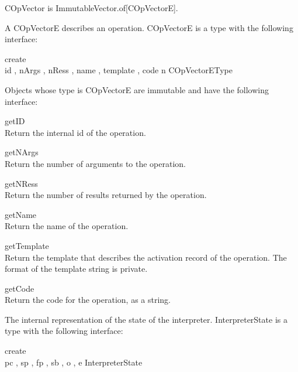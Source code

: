 \label{builtin COpVector}
COpVector is ImmutableVector.of[COpVectorE].

\label{builtin COpVectorE}
A COpVectorE describes an operation.  COpVectorE is a type with
the following interface:

\begin{desc}
  \item[\kw{operation} create\/\LB{}]~\\
    id \CO{} ,
    nArgs \CO{} ,
    nRess \CO{} ,
    name \CO{} ,
    template \CO{} ,
    code \CO{} \/\RB{} \returns{} \/\LB{}n \CO{} COpVectorEType\/\RB{}
\end{desc}

Objects whose type is COpVectorE are immutable and have the following
interface:

\begin{desc}
  \item[\kw{function}  getID \returns{} \/\LB{}\tn{Integer}\/\RB{}]~\\
    Return the internal id of the operation.    
  \item[\kw{function}  getNArgs \returns{} \/\LB{}\tn{Integer}\/\RB{}]~\\
    Return the number of arguments to the operation.
  \item[\kw{function}  getNRess \returns{} \/\LB{}\tn{Integer}\/\RB{}]~\\
    Return the number of results returned by the operation.
  \item[\kw{function}  getName \returns{} \/\LB{}\tn{String}\/\RB{}]~\\
    Return the name of the operation.
  \item[\kw{function}  getTemplate \returns{} \/\LB{}\tn{String}\/\RB{}]~\\
    Return the template that describes the activation record of the
    operation.  The format of the template string is private.
  \item[\kw{function}  getCode \returns{} \/\LB{}\tn{String}\/\RB{}]~\\
    Return the code for the operation, as a string.
\end{desc}

\label{builtin InterpreterState}
The internal representation of the state of the interpreter.  
InterpreterState is a type with the following interface:

\begin{desc}
  \item[\kw{operation} create\/\LB{}]~\\
    pc \CO{} ,
    sp \CO{} ,
    fp \CO{} ,
    sb \CO{} ,
    o \CO{} ,
    e \CO{} \/\RB{} 
  \returns{} \/\LB{}InterpreterState\/\RB{}
\end{desc}

